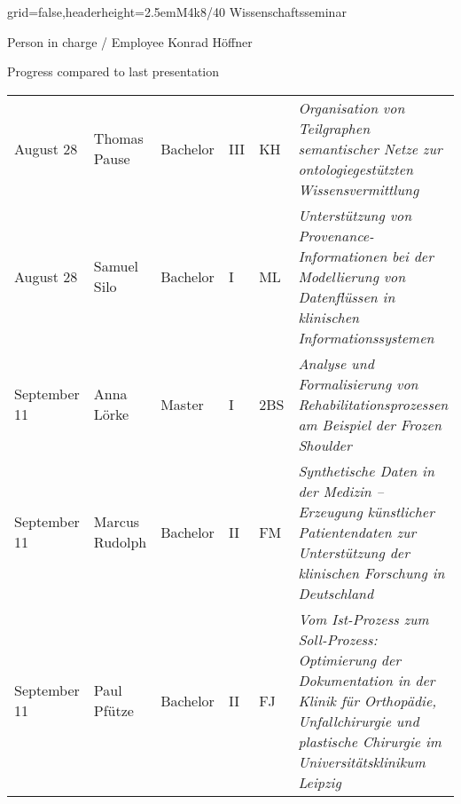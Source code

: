 \documentclass[english]{kiesgrube}
\begin{document}
\begin{poster}{grid=false,headerheight=2.5em}{}{M4k8/40 Wissenschaftsseminar}{}{}
\begin{posterbox}[name=person,column=0,row=0]{Person in charge / Employee}
Konrad Höffner
\end{posterbox}
\begin{posterbox}[name=progress,below=person,span=2]{Progress compared to last presentation}
\footnotesize
\begin{tabulary}{\textwidth}{lllllL}
August 28	&Thomas Pause			&Bachelor	&III		&KH	&\emph{Organisation von Teilgraphen semantischer Netze zur ontologiegestützten Wissensvermittlung}\\
August 28	&Samuel Silo			&Bachelor	&I		&ML	&\emph{Unterstützung von Provenance-Informationen bei der Modellierung von Datenflüssen in klinischen Informationssystemen}\\
September 11	&Anna Lörke			&Master		&I		&2BS	&\emph{Analyse und Formalisierung von Rehabilitationsprozessen am Beispiel der Frozen Shoulder}\\
September 11	&Marcus Rudolph			&Bachelor	&II		&FM	&\emph{Synthetische Daten in der Medizin -- Erzeugung künstlicher Patientendaten zur Unterstützung der klinischen Forschung in Deutschland}\\
September 11	&Paul Pfütze			&Bachelor	&II		&FJ	&\emph{Vom Ist-Prozess zum Soll-Prozess: Optimierung der Dokumentation in der Klinik für Orthopädie, Unfallchirurgie und plastische Chirurgie im Universitätsklinikum Leipzig}\\

\end{tabulary}
\end{posterbox}
\end{poster}
\end{document}
